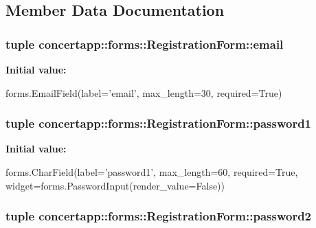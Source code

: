 \subsection{Member Data Documentation}
\hypertarget{classconcertapp_1_1forms_1_1_registration_form_ae7e72047b1f454db6f5c9c7232dc67b9}{
\subsubsection[{email}]{\setlength{\rightskip}{0pt plus 5cm}tuple {\bf concertapp::forms::RegistrationForm::email}}}
\label{classconcertapp_1_1forms_1_1_registration_form_ae7e72047b1f454db6f5c9c7232dc67b9}
{\bfseries Initial value:}
\begin{DoxyCode}
forms.EmailField(label='email',
                         max_length=30,
                         required=True)
\end{DoxyCode}
\hypertarget{classconcertapp_1_1forms_1_1_registration_form_a9db2b1df2aa51ed583d6d29d1d9b23ad}{
\subsubsection[{password1}]{\setlength{\rightskip}{0pt plus 5cm}tuple {\bf concertapp::forms::RegistrationForm::password1}}}
\label{classconcertapp_1_1forms_1_1_registration_form_a9db2b1df2aa51ed583d6d29d1d9b23ad}
{\bfseries Initial value:}
\begin{DoxyCode}
forms.CharField(label='password1',
                            max_length=60,
                            required=True,
                            widget=forms.PasswordInput(render_value=False))
\end{DoxyCode}
\hypertarget{classconcertapp_1_1forms_1_1_registration_form_afa9b67cdb3d9db3e8c2d7899cc399d5c}{
\subsubsection[{password2}]{\setlength{\rightskip}{0pt plus 5cm}tuple {\bf concertapp::forms::RegistrationForm::password2}}}
